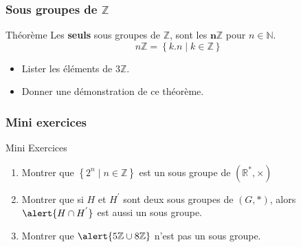 \documentclass{beamer}
\begin{document}
\begin{frame}[t]
  \frametitle{Sous groupes de $\mathbb{Z}$}
 \begin{block}{Théorème}
   Les \textbf{seuls} \alert{sous groupes} de $\mathbb{Z}$, sont les
   $\mathbf{n\mathbb{Z}}$ pour $n\in\mathbb{N}$.
   \begin{equation}
     n\mathbb{Z} = \left\{k.n \;|\; k\in \mathbb{Z}\right\}
   \end{equation}
 \end{block} 
 \begin{itemize}
   \item Lister les éléments de $3\mathbb{Z}$.\\[8pt]
   \item Donner une démonstration de ce théorème. 
 \end{itemize}
\end{frame}
\begin{frame}[t]
  \frametitle{Mini exercices}
 \begin{block}{Mini Exercices}
   \begin{enumerate}
     \item Montrer que $\left\{2^n\;|\; n\in \mathbb{Z}\right\}$ est un sous
       groupe de $\left(\mathbb{R}^{*}, \times\right)$\\[8pt]
     \item Montrer que si $H$ et $H^{'}$ sont deux sous groupes de $\left(G,
       *\right)$, alors $\alert{H\cap H^{'}}$ est aussi un sous groupe.\\[8pt]
     \item Montrer que $\alert{5\mathbb{Z}\cup 8\mathbb{Z}}$ n'est pas un sous
       groupe. 
   \end{enumerate}
 \end{block} 
\end{frame}
\end{document}
